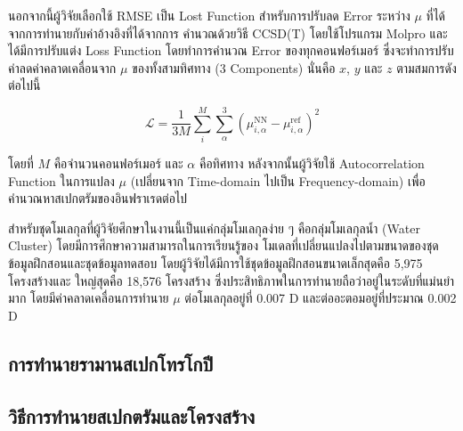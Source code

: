 นอกจากนี้ผู้วิจัยเลือกใช้ RMSE เป็น Lost Function สำหรับการปรับลด Error ระหว่าง $\mu$ ที่ได้จากการทำนายกับค่าอ้างอิงที่ได้จากการ%
คำนวณด้วยวิธี CCSD(T) โดยใช้โปรแกรม Molpro และได้มีการปรับแต่ง Loss Function โดยทำการคำนวณ Error ของทุกคอนฟอร์เมอร์ 
ซึ่งจะทำการปรับค่าลดค่าคลาดเคลื่อนจาก $\mu$ ของทั้งสามทิศทาง (3 Components) นั่นคือ $x$, $y$ และ $z$ ตามสมการดังต่อไปนี้

\begin{equation}
    \mathcal{L} = \frac{1}{3M} \sum^{M}_{i} \sum^{3}_{\alpha} (\mu^{\text{NN}}_{i,\alpha} 
    - \mu^{\text{ref}}_{i,\alpha})^{2}
\end{equation}

\noindent โดยที่ $M$ คือจำนวนคอนฟอร์เมอร์ และ $\alpha$ คือทิศทาง หลังจากนั้นผู้วิจัยใช้ Autocorrelation Function ในการแปลง 
$\mu$ (เปลี่ยนจาก Time-domain ไปเป็น Frequency-domain) เพื่อคำนวณหาสเปกตรัมของอินฟราเรดต่อไป 

สำหรับชุดโมเลกุลที่ผู้วิจัยศึกษาในงานนี้เป็นแค่กลุ่มโมเลกุลง่าย ๆ คือกลุ่มโมเลกุลน้ำ (Water Cluster) โดยมีการศึกษาความสามารถในการเรียนรู้ของ%
โมเดลที่เปลี่ยนแปลงไปตามขนาดของชุดข้อมูลฝึกสอนและชุดข้อมูลทดสอบ โดยผู้วิจัยได้มีการใช้ชุดข้อมูลฝึกสอนขนาดเล็กสุดคือ 5,975 โครงสร้างและ%
ใหญ่สุดคือ 18,576 โครงสร้าง ซึ่งประสิทธิภาพในการทำนายถือว่าอยู่ในระดับที่แม่นยำมาก โดยมีค่าคลาดเคลื่อนการทำนาย $\mu$ ต่อโมเลกุลอยู่ที่
0.007 D และต่ออะตอมอยู่ที่ประมาณ 0.002 D

\subsection{การทำนายรามานสเปกโทรโกปี}
\label{ssec:pred_spec_raman}


\subsection{วิธีการทำนายสเปกตรัมและโครงสร้าง}
\label{ssec:pred_spec_struct}

